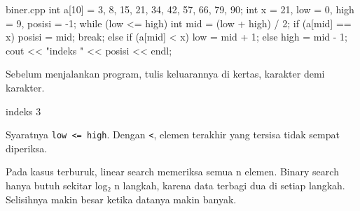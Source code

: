 \documentclass[a4paper]{article}
\begin{document}
\begin{MKode}{biner.cpp}
int a[10] = {3, 8, 15, 21, 34, 42, 57, 66, 79, 90};
int x = 21, low = 0, high = 9, posisi = -1;
while (low <= high) {
    int mid = (low + high) / 2;
    if (a[mid] == x) { posisi = mid; break; }
    else if (a[mid] < x) low = mid + 1;
    else high = mid - 1;
}
cout << "indeks " << posisi << endl;
\end{MKode}
\begin{Tebak}[]
Sebelum menjalankan program, tulis keluarannya di kertas, karakter demi karakter.
\end{Tebak}
\begin{Jawaban}[]
\begin{MKeluaran}[]
indeks 3
\end{MKeluaran}
Syaratnya \texttt{low <= high}. Dengan \texttt{<}, elemen terakhir yang tersisa tidak sempat diperiksa.
\end{Jawaban}
Pada kasus terburuk, linear search memeriksa semua n elemen. Binary search hanya butuh sekitar log₂ n langkah, karena data terbagi dua di setiap langkah. Selisihnya makin besar ketika datanya makin banyak.
\end{document}
